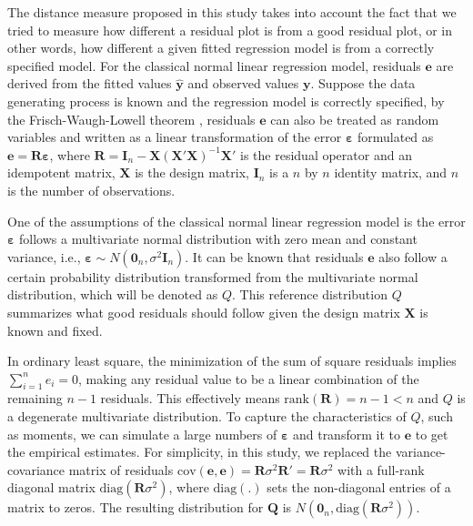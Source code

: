 \documentclass[]{interact}
\theoremstyle{plain}%
\theoremstyle{definition}
\theoremstyle{remark}
\begin{document}
The distance measure proposed in this study takes into account the fact
that we tried to measure how different a residual plot is from a good
residual plot, or in other words, how different a given fitted
regression model is from a correctly specified model. For the classical
normal linear regression model, residuals \(\boldsymbol{e}\) are derived
from the fitted values \(\hat{\boldsymbol{y}}\) and observed values
\(\boldsymbol{y}\). Suppose the data generating process is known and the
regression model is correctly specified, by the Frisch-Waugh-Lowell
theorem \citep{frisch1933partial}, residuals \(\boldsymbol{e}\) can also
be treated as random variables and written as a linear transformation of
the error \(\boldsymbol{\varepsilon}\) formulated as
\(\boldsymbol{e} = \boldsymbol{R}\boldsymbol{\varepsilon}\), where
\(\boldsymbol{R}=\boldsymbol{I}_n -\boldsymbol{X}(\boldsymbol{X}'\boldsymbol{X})^{-1}\boldsymbol{X}'\)
is the residual operator and an idempotent matrix, \(\boldsymbol{X}\) is
the design matrix, \(\boldsymbol{I}_n\) is a \(n\) by \(n\) identity
matrix, and \(n\) is the number of observations.

One of the assumptions of the classical normal linear regression model
is the error \(\boldsymbol{\varepsilon}\) follows a multivariate normal
distribution with zero mean and constant variance, i.e.,
\(\boldsymbol{\varepsilon} \sim N(\boldsymbol{0}_n,\sigma^2\boldsymbol{I}_n)\).
It can be known that residuals \(\boldsymbol{e}\) also follow a certain
probability distribution transformed from the multivariate normal
distribution, which will be denoted as \(Q\). This reference
distribution \(Q\) summarizes what good residuals should follow given
the design matrix \(\boldsymbol{X}\) is known and fixed.

In ordinary least square, the minimization of the sum of square
residuals implies \(\sum_{i=1}^{n} e_i = 0\), making any residual value
to be a linear combination of the remaining \(n - 1\) residuals. This
effectively means \(\text{rank}(\boldsymbol{R}) = n - 1 < n\) and \(Q\)
is a degenerate multivariate distribution. To capture the
characteristics of \(Q\), such as moments, we can simulate a large
numbers of \(\boldsymbol{\varepsilon}\) and transform it to
\(\boldsymbol{e}\) to get the empirical estimates. For simplicity, in
this study, we replaced the variance-covariance matrix of residuals
\(\text{cov}(\boldsymbol{e}, \boldsymbol{e}) = \boldsymbol{R}\sigma^2\boldsymbol{R}' = \boldsymbol{R}\sigma^2\)
with a full-rank diagonal matrix
\(\text{diag}(\boldsymbol{R}\sigma^2)\), where \(\text{diag}(.)\) sets
the non-diagonal entries of a matrix to zeros. The resulting
distribution for \(\boldsymbol{Q}\) is
\(N(\boldsymbol{0}_n, \text{diag}(\boldsymbol{R}\sigma^2))\).
\end{document}
